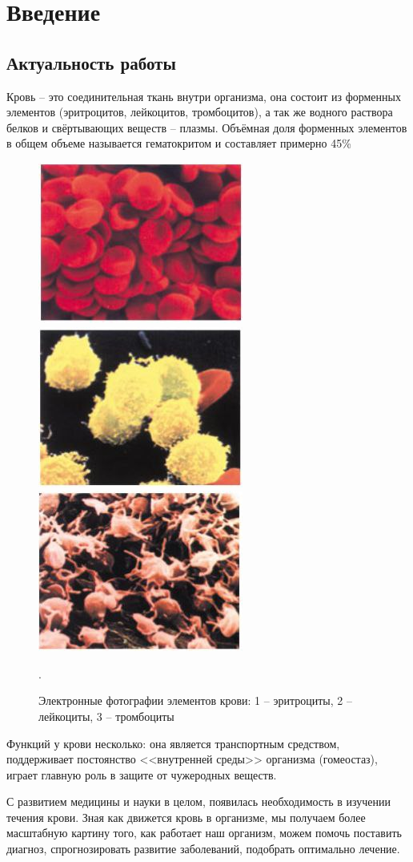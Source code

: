 \section{Введение}
\subsection{Актуальность работы}
Кровь -- это соединительная ткань внутри организма, она состоит из форменных элементов (эритроцитов, лейкоцитов, тромбоцитов), 
а так же водного раствора белков и свёртывающих веществ -- плазмы. Объёмная доля форменных элементов в общем объеме называется 
гематокритом и составляет примерно 45\%
\begin{figure}[h]
\centering
\includegraphics[width=0.3\linewidth]{erotr.jpg}
\includegraphics[width=0.3\linewidth]{leiko.jpg}
\includegraphics[width=0.3\linewidth]{trombo.jpg}
\caption{ Электронные фотографии элементов крови: 1 -- эритроциты, 2 -- лейкоциты, 3 -- тромбоциты ~\cite{rls:2003}}.
\label{fig:mpr}
\end{figure}
Функций у крови несколько: она является транспортным средством, поддерживает постоянство <<внутренней среды>> организма (гомеостаз), 
играет главную роль в защите от чужеродных веществ.

С развитием медицины и науки в целом, появилась необходимость в изучении течения крови. Зная как движется кровь в организме, 
мы получаем более масштабную картину того, как работает наш организм, можем помочь поставить диагноз, спрогнозировать развитие 
заболеваний, подобрать оптимально лечение.

